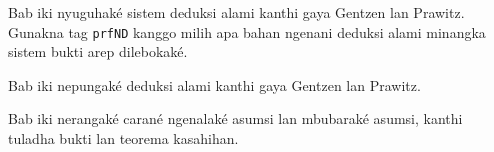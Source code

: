 \documentclass[../../../include/open-logic-chapter]{subfiles}
\begin{document}
      {}
      {}

\begin{editorial}
Bab iki nyuguhaké sistem deduksi alami kanthi gaya Gentzen lan
Prawitz. Gunakna tag \texttt{prfND} kanggo milih apa bahan ngenani
deduksi alami minangka sistem bukti arep dilebokaké.
\end{editorial}

Bab iki nepungaké deduksi alami kanthi gaya Gentzen lan Prawitz.

Bab iki nerangaké carané ngenalaké asumsi lan mbubaraké asumsi,
kanthi tuladha bukti lan teorema kasahihan.













\OLEndChapterHook
\end{document}
